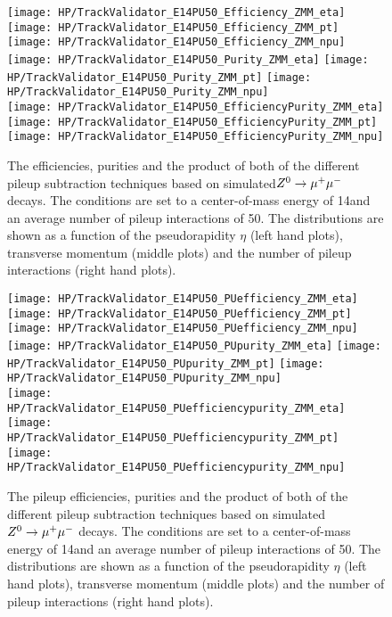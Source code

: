 \begin{figure}[!h]
  \centering
  \texttt{[image: HP/TrackValidator\_E14PU50\_Efficiency\_ZMM\_eta]}
  \texttt{[image: HP/TrackValidator\_E14PU50\_Efficiency\_ZMM\_pt]}
  \texttt{[image: HP/TrackValidator\_E14PU50\_Efficiency\_ZMM\_npu]}
   \\
  \texttt{[image: HP/TrackValidator\_E14PU50\_Purity\_ZMM\_eta]}
  \texttt{[image: HP/TrackValidator\_E14PU50\_Purity\_ZMM\_pt]}
  \texttt{[image: HP/TrackValidator\_E14PU50\_Purity\_ZMM\_npu]}
   \\
  \texttt{[image: HP/TrackValidator\_E14PU50\_EfficiencyPurity\_ZMM\_eta]}
  \texttt{[image: HP/TrackValidator\_E14PU50\_EfficiencyPurity\_ZMM\_pt]}
  \texttt{[image: HP/TrackValidator\_E14PU50\_EfficiencyPurity\_ZMM\_npu]}
  \caption[Efficiencies, purities and their product of the different pileup subtraction techniques based $\Zz\rightarrow\MM$ decays with 14\TeV and $\left<PU\right>=50$]{The efficiencies, purities and the product of both of the different pileup subtraction techniques based on simulated$\Zz\rightarrow\MM$ decays. The conditions are set to a center-of-mass energy of 14\TeV and an average number of pileup interactions of 50. The distributions are shown as a function of the pseudorapidity $\eta$ (left hand plots), transverse momentum (middle plots) and the number of pileup interactions (right hand plots).}
\end{figure}
\clearpage

\begin{figure}[!h]
  \centering
  \texttt{[image: HP/TrackValidator\_E14PU50\_PUefficiency\_ZMM\_eta]}
  \texttt{[image: HP/TrackValidator\_E14PU50\_PUefficiency\_ZMM\_pt]}
  \texttt{[image: HP/TrackValidator\_E14PU50\_PUefficiency\_ZMM\_npu]}
   \\
  \texttt{[image: HP/TrackValidator\_E14PU50\_PUpurity\_ZMM\_eta]}
  \texttt{[image: HP/TrackValidator\_E14PU50\_PUpurity\_ZMM\_pt]}
  \texttt{[image: HP/TrackValidator\_E14PU50\_PUpurity\_ZMM\_npu]}
   \\
  \texttt{[image: HP/TrackValidator\_E14PU50\_PUefficiencypurity\_ZMM\_eta]}
  \texttt{[image: HP/TrackValidator\_E14PU50\_PUefficiencypurity\_ZMM\_pt]}
  \texttt{[image: HP/TrackValidator\_E14PU50\_PUefficiencypurity\_ZMM\_npu]}
  \caption[Pileup efficiencies, purities and their product of the different pileup subtraction techniques based $\Zz\rightarrow\MM$ decays with 14\TeV and $\left<PU\right>=50$]{The pileup efficiencies, purities and the product of both of the different pileup subtraction techniques based on simulated$\Zz\rightarrow\MM$ decays. The conditions are set to a center-of-mass energy of 14\TeV and an average number of pileup interactions of 50. The distributions are shown as a function of the pseudorapidity $\eta$ (left hand plots), transverse momentum (middle plots) and the number of pileup interactions (right hand plots).}
\end{figure}
\clearpage

